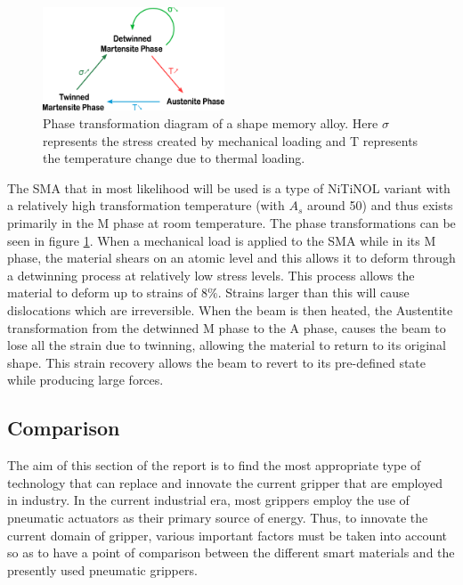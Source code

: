 \begin{figure}
  \centering
  \includegraphics[width=0.48\textwidth]{Figures/Phase_Transf_Diagram_noText.eps}
  \caption{Phase transformation diagram of a shape memory alloy. Here $\sigma$ represents the stress created by mechanical loading and T represents the temperature change due to thermal loading.}
	\vspace{-10pt}
  \label{fig:PhaseTransfDiagram}
\end{figure}


The SMA that in most likelihood will be used is a type of NiTiNOL variant with a relatively high transformation temperature (with $A_s$ around 50\degreeC) and thus exists primarily in the M phase at room temperature. The phase transformations can be seen in figure \ref{fig:PhaseTransfDiagram}. When a mechanical load is applied to the SMA while in its M phase, the material shears on an atomic level and this allows it to deform through a detwinning process at relatively low stress levels. This process allows the material to deform up to strains of 8$\%$. Strains larger than this will cause dislocations which are irreversible. When the beam is then heated, the Austentite transformation from the detwinned M phase to the A phase, causes the beam to lose all the strain due to twinning, allowing the material to return to its original shape. This strain recovery allows the beam to revert to its pre-defined state while producing large forces.

\subsection{Comparison}
The aim of this section of the report is to find the most appropriate type of technology that can replace and innovate the current gripper that are employed in industry. In the current industrial era, most grippers employ the use of pneumatic actuators as their primary source of energy. Thus, to innovate the current domain of gripper, various important factors must be taken into account so as to have a point of comparison between the different smart materials and the presently used pneumatic grippers.

